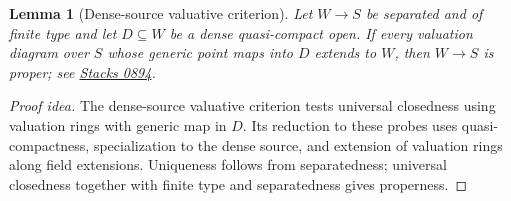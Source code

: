 \documentclass[11pt]{article}
\theoremstyle{plain}
\newtheorem{lemma}[theorem]{Lemma}
\theoremstyle{definition}
\newcommand{\stacks}[1]{\href{https://stacks.math.columbia.edu/tag/#1}{Stacks #1}}
\begin{document}
\begin{lemma}[Dense-source valuative criterion]
\label{lem:nagata-sketch-dense-valuative}
Let $W\to S$ be separated and of finite type and let $D\subseteq W$
be a dense quasi-compact open.  If every valuation diagram over $S$
whose generic point maps into $D$ extends to $W$, then $W\to S$
is proper; see \stacks{0894}.
\end{lemma}
\begin{proof}[Proof idea]
The dense-source valuative criterion tests universal closedness using
valuation rings with generic map in $D$.  Its reduction to these probes
uses quasi-compactness, specialization to the dense source, and extension
of valuation rings along field extensions.  Uniqueness follows from
separatedness; universal closedness together with finite type and
separatedness gives properness.
\end{proof}
\end{document}
